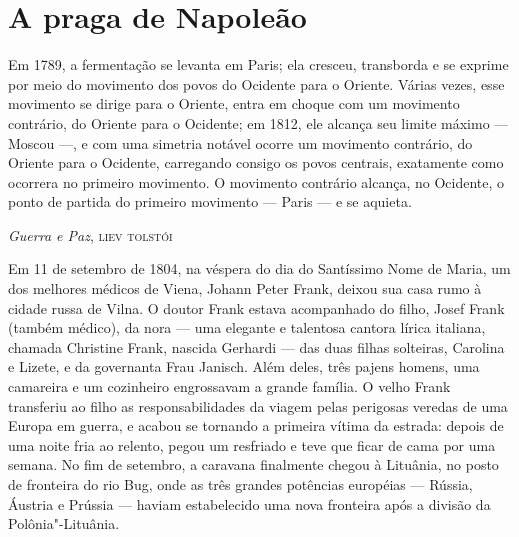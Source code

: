 \chapter{A praga de Napoleão}

\epigraph{Em 1789, a fermentação se levanta em Paris; ela cresceu, transborda e se
exprime por meio do movimento dos povos do Ocidente para o Oriente.
Várias vezes, esse movimento se dirige para o Oriente, entra em choque
com um movimento contrário, do Oriente para o Ocidente; em 1812, ele
alcança seu limite máximo --- Moscou ---, e com uma simetria notável ocorre
um movimento contrário, do Oriente para o Ocidente, carregando consigo
os povos centrais, exatamente como ocorrera no primeiro movimento. O
movimento contrário alcança, no Ocidente, o ponto de partida do primeiro
movimento --- Paris --- e se aquieta.}{\emph{Guerra e Paz}, \textsc{liev tolstói}\footnotemark}


Em 11 de setembro de 1804, na véspera do dia do Santíssimo Nome de
Maria, um dos melhores médicos de Viena, 
Johann Peter Frank, deixou sua
casa rumo à cidade russa de Vilna. O doutor Frank estava acompanhado do
filho, Josef Frank (também médico), da nora --- uma 
elegante e talentosa cantora lírica italiana, chamada Christine Frank,
nascida Gerhardi --- das
duas filhas solteiras, Carolina e Lizete, e da governanta Frau Janisch.
Além deles, três pajens homens, uma camareira e um cozinheiro
engrossavam a grande família. O velho Frank transferiu ao filho as
responsabilidades da viagem pelas perigosas veredas de uma Europa em
guerra, e acabou se tornando a primeira vítima da estrada: depois de uma
noite fria ao relento, pegou um resfriado e teve que ficar de cama por
uma semana. No fim de setembro, a caravana finalmente chegou à Lituânia,
no posto de fronteira do rio Bug, onde as três grandes potências
européias --- Rússia, Áustria e Prússia --- haviam estabelecido uma nova
fronteira após a divisão da Polônia"-Lituânia.

